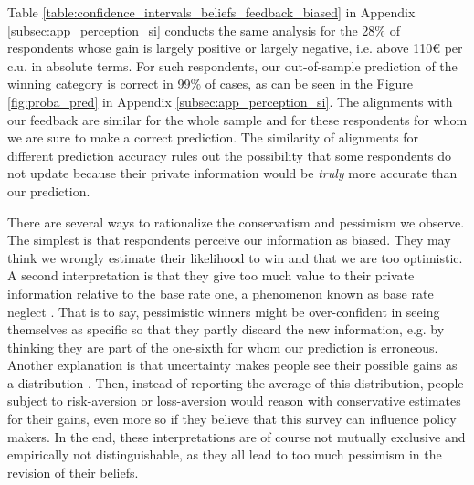 \documentclass[11pt]{article}
\begin{document}
Table \ref{table:confidence_intervals_beliefs_feedback_biased} in Appendix \ref{subsec:app_perception_si} conducts the same analysis for the 28\% of respondents whose gain is largely positive or largely negative, i.e. above 110\euro{} per c.u. in absolute terms. For such respondents, our out-of-sample prediction of the winning category is correct in 99\% of cases, as can be seen in the Figure \ref{fig:proba_pred} in Appendix \ref{subsec:app_perception_si}. The alignments with our feedback are similar for the whole sample and for these respondents for whom we are sure to make a correct prediction. The similarity of alignments for different prediction accuracy rules out the possibility that some respondents do not update because their private information would be \textit{truly} more accurate than our prediction.

There are several ways to rationalize the conservatism and pessimism we observe. The simplest is that respondents perceive our information as biased. They may think we wrongly estimate their likelihood to win and that we are too optimistic. A second interpretation is that they give too much value to their private information relative to the base rate one, a phenomenon known as base rate neglect \citep{grether_bayes_1980}. That is to say, pessimistic winners might be over-confident in seeing themselves as specific so that they partly discard the new information, e.g. by thinking they are part of the one-sixth for whom our prediction is erroneous. Another explanation is that uncertainty makes people see their possible gains as a distribution \citep[see][]{stiglitz_addressing_2019}. Then, instead of reporting the average of this distribution, people subject to risk-aversion or loss-aversion would reason with conservative estimates for their gains, even more so if they believe that this survey can influence policy makers. In the end, these interpretations are of course not mutually exclusive and empirically not distinguishable, as they all lead to too much pessimism in the revision of their beliefs.
\end{document}
